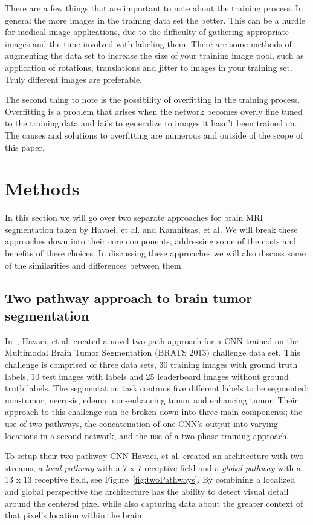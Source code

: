 \documentclass{sig-alternate}
\begin{document}
There are a few things that are important to note about the training process. In general the more images in the training data set the better. This can be a hurdle for medical image applications, due to the difficulty of gathering appropriate images and the time involved with labeling them. There are some methods of augmenting the data set to increase the size of your training image pool, such as application of rotations, translations and jitter to images in your training set. Truly different images are preferable.

The second thing to note is the possibility of overfitting in the training process. Overfitting is a problem that arises when the network becomes overly fine tuned to the training data and fails to generalize to images it hasn't been trained on. The causes and solutions to overfitting are numerous and outside of the scope of this paper.

\section{Methods}
\label{sec:methods}

In this section we will go over two separate approaches for brain MRI segmentation taken by Havaei, et al. and Kamnitsas, et al. We will break these approaches down into their core components, addressing some of the costs and benefits of these choices. In discussing these approaches we will also discuss some of the similarities and differences between them.

\subsection{Two pathway approach to brain tumor segmentation}
\label{sec:novelBrainTumorApproach}
In~\cite{Havaei:2017}, Havaei, et al. created a novel two path approach for a CNN trained on the Multimodal Brain Tumor Segmentation (BRATS 2013) challenge data set. This challenge is comprised of three data sets, 30 training images with ground truth labels, 10 test images with labels and 25 leaderboard images without ground truth labels. The segmentation task contains five different labels to be segmented; non-tumor, necrosis, edema, non-enhancing tumor and enhancing tumor. Their approach to this challenge can be broken down into three main components; the use of two pathways, the concatenation of one CNN's output into varying locations in a second network, and the use of a two-phase training approach.

To setup their two pathway CNN Havaei, et al. created an architecture with two streams, a \textit{local pathway} with a 7 x 7 receptive field and a \textit{global pathway} with a 13 x 13 receptive field, see Figure~\ref{fig:twoPathways}. By combining a localized and global perspective the architecture has the ability to detect visual detail around the centered pixel while also capturing data about the greater context of that pixel's location within the brain.
\end{document}
